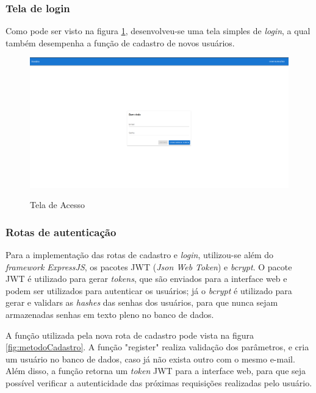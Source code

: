 \subsubsection{Tela de login}
Como pode ser visto na figura \ref{fig:login}, desenvolveu-se uma tela simples de \textit{login}, a qual também desempenha a função de cadastro de novos usuários.

\begin{figure}[!htb]
	\centering
	\caption{Tela de Acesso}
	\includegraphics[width=1\textwidth]{./dados/figuras/telaLogin}
	\label{fig:login}
\end{figure}
\pagebreak

\subsubsection{Rotas de autenticação}
Para a implementação das rotas de cadastro e \textit{login}, utilizou-se além do \textit{framework ExpressJS}, os pacotes JWT (\textit{Json Web Token}) e \textit{bcrypt}. O pacote JWT é utilizado para gerar \textit{tokens}, que são enviados para a interface web e podem ser utilizados para autenticar os usuários; já o \textit{bcrypt} é utilizado para gerar e validars as \textit{hashes} das senhas dos usuários, para que nunca sejam armazenadas senhas em texto pleno no banco de dados.

A função utilizada pela nova rota de cadastro pode vista na figura \ref{fig:metodoCadastro}. A função "register" realiza validação dos parâmetros, e cria um usuário no banco de dados, caso já não exista outro com o mesmo e-mail. Além disso, a função retorna um \textit{token} JWT para a interface web, para que seja possível verificar a autenticidade das próximas requisições realizadas pelo usuário. 

